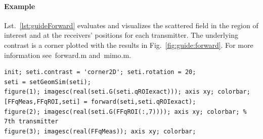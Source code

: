\documentclass[a4paper]{article}
\begin{document}
\paragraph{Example} Lst.~\ref{lst:guideForward} evaluates and visualizes the scattered field in the region of interest and at the receivers' positions for each transmitter. The underlying contrast is a corner plotted with the results in Fig.~\ref{fig:guide:forward}. 
For more information see~\textsf{forward.m} and~\textsf{mimo.m}.

\begin{lstlisting}[caption={Compute the scattered field by the routine \textsf{forward} for a corner-shaped contrast rotated by $20^\circ$ (\emph{source code}: \textsf{guides/guideForward.m}).},label=lst:guideForward]
init; seti.contrast = 'corner2D'; seti.rotation = 20;
seti = setGeomSim(seti);
figure(1); imagesc(real(seti.G(seti.qROIexact))); axis xy; colorbar;
[FFqMeas,FFqROI,seti] = forward(seti,seti.qROIexact);
figure(2); imagesc(real(seti.G(FFqROI(:,7)))); axis xy; colorbar; % 7th transmitter
figure(3); imagesc(real(FFqMeas)); axis xy; colorbar;
\end{lstlisting}
\end{document}

